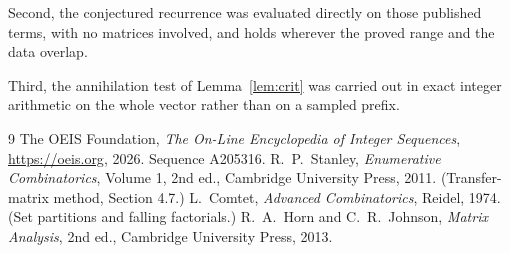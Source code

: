 \documentclass[11pt,a4paper]{article}
\theoremstyle{plain}
\theoremstyle{definition}
\begin{document}
Second, the conjectured recurrence was evaluated directly on those published terms, with no
matrices involved, and holds wherever the proved range and the data overlap.

Third, the annihilation test of Lemma~\ref{lem:crit} was carried out in exact integer
arithmetic on the whole vector rather than on a sampled prefix.

\begin{thebibliography}{9}
 The OEIS Foundation, \emph{The On-Line Encyclopedia of Integer
Sequences}, \url{https://oeis.org}, 2026. Sequence A205316.
 R.~P.~Stanley, \emph{Enumerative Combinatorics}, Volume 1, 2nd ed.,
Cambridge University Press, 2011. (Transfer-matrix method, Section 4.7.)
 L.~Comtet, \emph{Advanced Combinatorics}, Reidel, 1974. (Set partitions
and falling factorials.)
 R.~A.~Horn and C.~R.~Johnson, \emph{Matrix Analysis}, 2nd ed., Cambridge
University Press, 2013.
\end{thebibliography}
\end{document}
